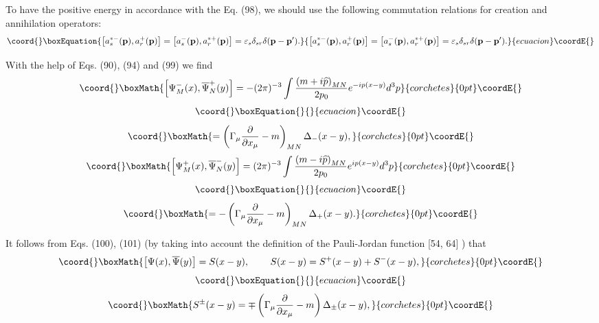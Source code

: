 \documentclass[a4paper,12pt]{article}
\begin{document}
To have the positive energy in accordance with the Eq. (98), we should use
the following commutation relations for creation and annihilation operators:
\begin{equation}\coord{}\boxEquation{
\left[ a_s^{*-}(\mathbf{p}),a_r^{+}(\mathbf{p})\right] =\left[
a_s^{-}( \mathbf{p}),a_r^{*+}(\mathbf{p})\right] =\varepsilon
_s\delta _{sr}\delta ( \mathbf{p}-\mathbf{p}^{\prime })
.\label{99}
}{
\left[ a_s^{*-}(\mathbf{p}),a_r^{+}(\mathbf{p})\right] =\left[
a_s^{-}( \mathbf{p}),a_r^{*+}(\mathbf{p})\right] =\varepsilon
_s\delta _{sr}\delta ( \mathbf{p}-\mathbf{p}^{\prime })
.}{ecuacion}\coordE{}\end{equation}

With the help of Eqs. (90), (94) and (99) we find
\[\coord{}\boxMath{
\left[ \Psi _M^{-}(x),\overline{\Psi }_N^{+}(y)\right] =-(2\pi
)^{-3}\int \frac{\left( m+i\widehat{p}\right)
_{MN}}{2p_0}e^{-ip(x-y)}d^3p
}{corchetes}{0pt}\coordE{}\]
\vspace{-8mm}
\begin{equation}\coord{}\boxEquation{
\label{100}
}{
}{ecuacion}\coordE{}\end{equation}
\vspace{-8mm}
\[\coord{}\boxMath{
=\left( \Gamma _\mu \frac \partial {\partial x_\mu }-m\right)
_{MN}\Delta _{-}(x-y) ,
}{corchetes}{0pt}\coordE{}\]
\[\coord{}\boxMath{
\left[ \Psi _M^{+}(x),\overline{\Psi }_N^{-}(y)\right] =(2\pi )^{-3}\int
\frac{\left( m-i\widehat{p}\right) _{MN}}{2p_0}e^{ip(x-y)}d^3p
}{corchetes}{0pt}\coordE{}\]
\vspace{-8mm}
\begin{equation}\coord{}\boxEquation{
\label{101}
}{
}{ecuacion}\coordE{}\end{equation}
\vspace{-8mm}
\[\coord{}\boxMath{
=-\left( \Gamma _\mu \frac \partial {\partial x_\mu }-m\right)
_{MN}\Delta _{+}(x-y) .
}{corchetes}{0pt}\coordE{}\]

It follows from Eqs. (100), (101) (by taking into account the definition of
the Pauli-Jordan function [54, 64] \coordHE{}) that
\[\coord{}\boxMath{
\left[ \Psi (x),\overline{\Psi }(y)\right] =S(x-y) ,\hspace{0.3in}
S(x-y)=S^{+}(x-y)+S^{-}(x-y) ,
}{corchetes}{0pt}\coordE{}\]
\vspace{-8mm}
\begin{equation}\coord{}\boxEquation{
\label{102}
}{
}{ecuacion}\coordE{}\end{equation}
\vspace{-8mm}
\[\coord{}\boxMath{
S^{\pm }(x-y)=\mp \left( \Gamma _\mu \frac \partial {\partial
x_\mu }-m\right) \Delta _{\pm }(x-y) ,
}{corchetes}{0pt}\coordE{}\]
\end{document}
